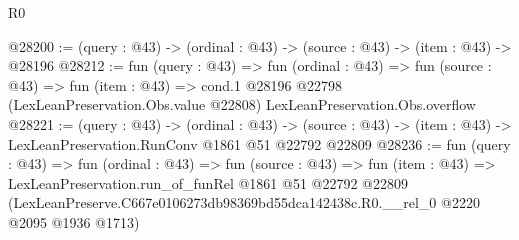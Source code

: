 \begin{lexlean}{R0}
\begin{coremodule}
@28200 := (query : @43) -> (ordinal : @43) -> (source : @43) -> (item : @43) -> @28196
@28212 := fun (query : @43) =>
  fun (ordinal : @43) =>
  fun (source : @43) =>
  fun (item : @43) =>
  cond.{1} @28196 @22798 (LexLeanPreservation.Obs.value @22808) LexLeanPreservation.Obs.overflow
@28221 := (query : @43) ->
  (ordinal : @43) ->
  (source : @43) -> (item : @43) -> LexLeanPreservation.RunConv @1861 @51 @22792 @22809
@28236 := fun (query : @43) =>
  fun (ordinal : @43) =>
  fun (source : @43) =>
  fun (item : @43) =>
  LexLeanPreservation.run_of_funRel
    @1861
    @51
    @22792
    @22809
    (LexLeanPreserve.C667e0106273db98369bd55dca142438c.R0.__rel_0 @2220 @2095 @1936 @1713)
\end{coremodule}
\end{lexlean}
